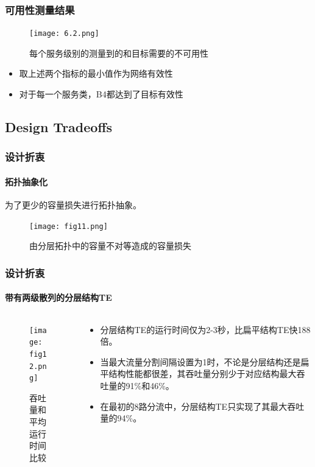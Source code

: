 \begin{frame}
    \frametitle{可用性测量结果}
    \begin{figure}
        \centering
        \texttt{[image: 6.2.png]}
        \caption{每个服务级别的测量到的和目标需要的不可用性} %
    \end{figure}

    \begin{itemize}
        \item 取上述两个指标的最小值作为网络有效性
        \item 对于每一个服务类，B4都达到了目标有效性
    \end{itemize}
\end{frame}

\subsection{Design Tradeoffs}

\begin{frame}
    \frametitle{设计折衷}
    \framesubtitle{拓扑抽象化}
    为了更少的容量损失进行拓扑抽象。
    \begin{figure}[h]%
        \centering  %
        \texttt{[image: fig11.png]}
        \caption{由分层拓扑中的容量不对等造成的容量损失}  %
    \end{figure}
\end{frame}

\begin{frame}
    \frametitle{设计折衷}
    \framesubtitle{带有两级散列的分层结构TE}
    \begin{columns}
        \begin{column}{0.4\textwidth}
            \begin{figure}[h]%
                \centering  %
                \texttt{[image: fig12.png]}
                \caption{吞吐量和平均运行时间比较}  %
            \end{figure}
        \end{column}
        \begin{column}{0.6\textwidth}
            \begin{itemize}
                \item 分层结构TE的运行时间仅为2-3秒，比扁平结构TE快188倍。
                \item 当最大流量分割间隔设置为1时，不论是分层结构还是扁平结构性能都很差，其吞吐量分别少于对应结构最大吞吐量的91\%和46\%。
                \item 在最初的8路分流中，分层结构TE只实现了其最大吞吐量的94\%。
            \end{itemize}
        \end{column}
    \end{columns}
\end{frame}

